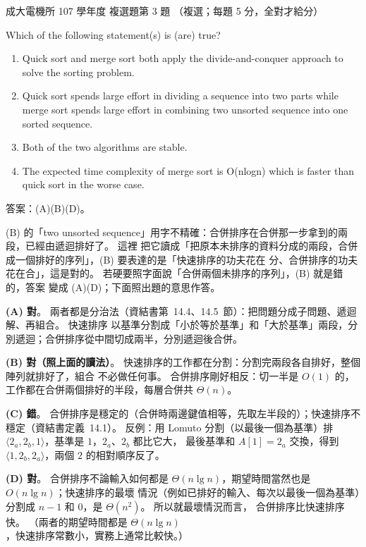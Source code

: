 \begin{pastexam}[label={px:ncku-107-ee-ds-02}]{成大電機所 107 學年度 複選題第 3 題}
（複選；每題 5 分，全對才給分）

Which of the following statement(s) is (are) true?
\begin{enumerate}[label=(\Alph*)]
\item Quick sort and merge sort both apply the divide-and-conquer approach to solve the sorting
problem.
\item Quick sort spends large effort in dividing a sequence into two parts while merge sort spends
large effort in combining two unsorted sequence into one sorted sequence.
\item Both of the two algorithms are stable.
\item The expected time complexity of merge sort is O(nlogn) which is faster than quick sort in the
worse case.
\end{enumerate}
\end{pastexam}

\begin{pastsoln}
答案：(A)(B)(D)。

(B) 的「two unsorted sequence」用字不精確：合併排序在合併那一步拿到的兩段，已經由遞迴排好了。 這裡
把它讀成「把原本未排序的資料分成的兩段，合併成一個排好的序列」，(B) 要表達的是「快速排序的功夫花在
分、合併排序的功夫花在合」，這是對的。 若硬要照字面說「合併兩個未排序的序列」，(B) 就是錯的，答案
變成 (A)(D)；下面照出題的意思作答。

\textbf{(A) 對}。 兩者都是分治法（資結書第~14.4、14.5~節）：把問題分成子問題、遞迴解、再組合。 快速排序
以基準分割成「小於等於基準」和「大於基準」兩段，分別遞迴；合併排序從中間切成兩半，分別遞迴後合併。

\textbf{(B) 對（照上面的讀法）}。 快速排序的工作都在分割：分割完兩段各自排好，整個陣列就排好了，組合
不必做任何事。 合併排序剛好相反：切一半是 $O(1)$ 的，工作都在合併兩個排好的半段，每層合併共 $\Theta(n)$。

\textbf{(C) 錯}。 合併排序是穩定的（合併時兩邊鍵值相等，先取左半段的）；快速排序不穩定（資結書定義~14.1）。
反例：用 Lomuto 分割（以最後一個為基準）排 $\langle 2_a, 2_b, 1 \rangle$，基準是 $1$，$2_a$、$2_b$ 都比它大，
最後基準和 $A[1] = 2_a$ 交換，得到 $\langle 1, 2_b, 2_a \rangle$，兩個 $2$ 的相對順序反了。

\textbf{(D) 對}。 合併排序不論輸入如何都是 $\Theta(n \lg n)$，期望時間當然也是 $O(n \lg n)$；快速排序的最壞
情況（例如已排好的輸入、每次以最後一個為基準）分割成 $n - 1$ 和 $0$，是 $\Theta(n^2)$。 所以就最壞情況而言，
合併排序比快速排序快。 （兩者的期望時間都是 $\Theta(n \lg n)$，快速排序常數小，實務上通常比較快。）
\end{pastsoln}
